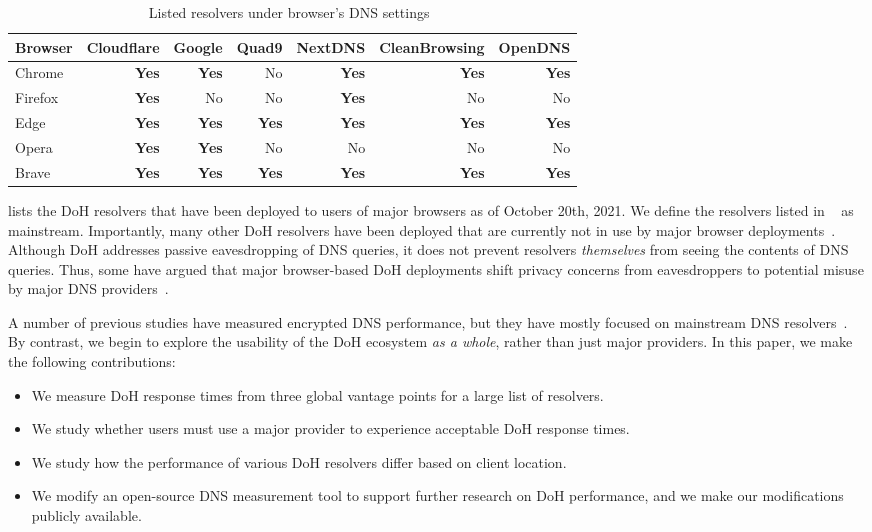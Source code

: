{\begin{table}
    \centering
    \begin{tabular}{lrrrrrr}
    \hline
    Browser & Cloudflare & Google & Quad9 & NextDNS & CleanBrowsing & OpenDNS
    \\
    \midrule
    Chrome    & \textbf{Yes} & \textbf{Yes} & No & \textbf{Yes} & \textbf{Yes} & \textbf{Yes} \\
    Firefox  & \textbf{Yes} & No & No & \textbf{Yes} & No & No \\ 
    Edge   & \textbf{Yes} & \textbf{Yes} & \textbf{Yes} & \textbf{Yes} & \textbf{Yes} & \textbf{Yes} \\
    Opera            & \textbf{Yes} & \textbf{Yes} & No & No & No & No \\
    Brave            & \textbf{Yes} & \textbf{Yes} & \textbf{Yes} & \textbf{Yes} & \textbf{Yes} & \textbf{Yes} \\
    \bottomrule
    \end{tabular}
    \caption{Listed resolvers under browser's DNS settings~\cite{bravebrowser, edgebrowser, ffbrowser, chromebrowser, operabrowser}}
    \label{tab:SupportedResolvers}
\end{table}

 lists the DoH resolvers that have been deployed to users of major browsers as of October 20th, 2021.
We define the resolvers listed in ~ as mainstream. 
Importantly, many other DoH resolvers have been deployed that are currently not in use by major browser deployments~\cite{dnscrypt}.
Although DoH addresses passive eavesdropping of DNS queries, it does not prevent resolvers \emph{themselves} from seeing the contents of DNS queries.
Thus, some have argued that major browser-based DoH deployments shift privacy concerns from eavesdroppers to potential misuse by major DNS providers~\cite{vixie}.

A number of previous studies have measured encrypted DNS performance, but they have mostly focused on mainstream DNS resolvers~\cite{borgolte2019dns,hounsel2020comparing,KResolver}.
By contrast, we begin to explore the usability of the DoH ecosystem \emph{as a whole}, rather than just major providers.
In this paper, we make the following contributions:
\begin{itemize}
    \item We measure DoH response times from three global vantage points for a large list of resolvers.
    \item We study whether users must use a major provider to experience acceptable DoH response times.
    \item We study how the performance of various DoH resolvers differ based on client location.
    \item We modify an open-source DNS measurement tool to support further research on DoH performance, and we make our modifications publicly available.
\end{itemize}

}
